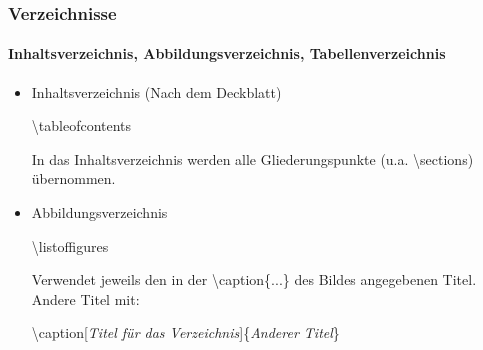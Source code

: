 
\begin{frame}
\frametitle{Verzeichnisse}
\framesubtitle{Inhaltsverzeichnis, Abbildungsverzeichnis, Tabellenverzeichnis}
\begin{itemize}


\item Inhaltsverzeichnis (Nach dem Deckblatt)\\
\medskip
\begin{ttfamily}{\normalsize
\color{nounibaredI}\textbackslash tableofcontents\\}
\end{ttfamily}
\medskip
In das Inhaltsverzeichnis werden alle Gliederungspunkte (u.a. \color{unibablueI} \textbackslash section\color{black}s) übernommen.\\
\medskip

\item Abbildungsverzeichnis\\
\medskip
\begin{ttfamily}{\normalsize
\color{nounibaredI}\textbackslash listoffigures\\}
\end{ttfamily}
\medskip
Verwendet jeweils den in der {\ttfamily \color{nounibaredI}\textbackslash caption\color{black}\{...\}} des Bildes angegebenen Titel. 
Andere Titel mit:\\ 
\begin{ttfamily}{\normalsize
\color{nounibaredI} \textbackslash caption\color{nounibagreenI}[\textit{Titel für das Verzeichnis}]\color{black}\{\textit{Anderer Titel}\}\\}
\end{ttfamily}
\medskip


\end{itemize}
\end{frame}
